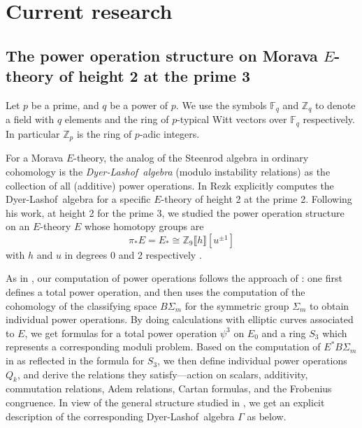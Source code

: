 \documentclass{rs}
\theoremstyle{definition}
\theoremstyle{remark}
\newcommand{\mb}[1]{\mathbb{#1}}
\newcommand{\DL}{Dyer-Lashof~}
\newcommand{\BF}{{\mb F}}
\newcommand{\BZ}{{\mb Z}}
\newcommand{\G}{\Gamma}
\newcommand{\p}{\psi^3}
\begin{document}
\section{Current research}

\subsection{The power operation structure on Morava $E$-theory of height 2 at the prime 3}
\label{subsec:h2p3}

Let $p$ be a prime, and $q$ be a power of $p$.  
We use the symbols $\BF_q$ and $\BZ_q$ to denote a field with $q$ elements 
and the ring of $p$-typical Witt vectors over $\BF_q$ respectively.  
In particular $\BZ_p$ is the ring of $p$-adic integers.  

For a Morava $E$-theory, the analog of the Steenrod algebra in ordinary cohomology is 
the {\em \DL algebra} (modulo instability relations) as the collection of all (additive) power operations.  
In \cite{h2p2} Rezk explicitly computes the \DL algebra for a specific $E$-theory of height 2 at the prime 2.  
Following his work, at height 2 for the prime 3, 
we studied the power operation structure on an $E$-theory $E$ whose homotopy groups are 
\[
 \pi_* E = E_* \cong \BZ_9 \llbracket h \rrbracket [u^{\pm 1}] 
\]
with $h$ and $u$ in degrees 0 and 2 respectively \cite[Sections 2 and 3]{p3}.  

As in \cite{h2p2}, our computation of power operations follows the approach of \cite{steenrod}: 
one first defines a total power operation, 
and then uses the computation of the cohomology of the classifying space $B\Sigma_m$ for the symmetric group $\Sigma_m$ to obtain individual power operations.  
By doing calculations with elliptic curves associated to $E$, 
we get formulas for a total power operation $\p$ on $E_0$ and a ring $S_3$ which represents a corresponding moduli problem.  
Based on the computation of $E^* B\Sigma_m$ in \cite{Str98} as reflected in the formula for $S_3$, 
we then define individual power operations $Q_k$, and derive the relations they satisfy---action on scalars, additivity, 
commutation relations, Adem relations, Cartan formulas, and the Frobenius congruence.  
In view of the general structure studied in \cite{cong}, we get an explicit description of the corresponding \DL algebra $\G$ as below.  
\end{document}
